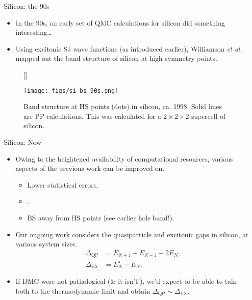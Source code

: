 \documentclass[12pt, pdf, hyperref={draft}, usenames, dvipsnames,
aspectratio=169]{beamer}
\newcommand{\blue}[1]{{\bf\color{NavyBlue}{#1}}}
\begin{document}
\begin{frame}{Silicon: the 90s}
\begin{itemize}
  \item In the 90s, an early set of QMC calculations for silicon did something
  interesting\ldots
  \item Using excitonic SJ wave functions (as introduced earlier), Williamson
  \textit{et al.} mapped out the band structure of
  silicon at high symmetry points.
\end{itemize}
\begin{figure}[H]
  [\FBwidth]
  {\caption{Band structure at HS points (dots) in silicon, ca. 1998. Solid
  lines are PP calculations. This was calculated for a $2\times2\times2$
  supercell of silicon.}\label{fig:si_bs_90s}}
  {\texttt{[image: figs/si\_bs\_90s.png]}}
\end{figure}
\end{frame}


\begin{frame}{Silicon: Now}
\begin{itemize}
  \item Owing to the heightened availability of computational resources,
  various aspects of the previous work can be improved on.
  \begin{itemize}
    \item Lower statistical errors.
    \item \blue{Finite size effects}.
    \item BS away from HS points (see earlier hole band!).
  \end{itemize}
  \item Our ongoing work considers the quasiparticle and excitonic gaps in
  silicon, at various system sizes.
  \begin{align}
    \Delta_{\text{QP}} &= E_{N+1} + E_{N-1} - 2E_{N} \nonumber, \\
    \Delta_{\text{EX}} &= E^{\star}_{N} - E_{N}.
  \end{align}
  \item If DMC were not pathological (\& it isn't!), we'd expect to be able to
  take both to the thermodynamic limit and obtain $\Delta_{\text{QP}} \sim
  \Delta_{\text{EX}}$.
\end{itemize}
\end{frame}
\end{document}

